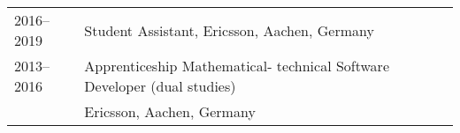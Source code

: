 
\begin{longtable}[l]{@{}p{} p{}}
    2016--2019 & Student Assistant, Ericsson, Aachen, Germany\\
    2013--2016 & Apprenticeship Mathematical- technical Software Developer (dual studies)\\
               & Ericsson, Aachen, Germany


\end{longtable}
